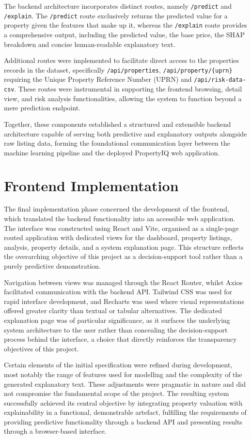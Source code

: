 The backend architecture incorporates distinct routes, namely \verb|/predict| and \verb|/explain|. The \verb|/predict| route exclusively returns the predicted value for a property given the features that make up it, whereas the \verb|/explain| route provides a comprehensive output, including the predicted value, the base price, the SHAP breakdown and concise human-readable explanatory text.

Additional routes were implemented to facilitate direct access to the properties records in the dataset, specifically \verb|/api/properties|, \verb|/api/property/{uprn}| requiring the Unique Property Reference Number (UPRN) and \verb|/api/risk-data-csv|. These routes were instrumental in supporting the frontend browsing, detail view, and risk analysis functionalities, allowing the system to function beyond a mere prediction endpoint.

Together, these components established a structured and extensible backend architecture capable of serving both predictive and explanatory outputs alongside raw listing data, forming the foundational communication layer between the machine learning pipeline and the deployed PropertyIQ web application.


\section{Frontend Implementation}

The final implementation phase concerned the development of the frontend, which translated the backend functionality into an accessible web application. The interface was constructed using React and Vite, organised as a single-page routed application with dedicated views for the dashboard, property listings, analysis, property details, and a system explanation page. This structure reflects the overarching objective of this project as a decision-support tool rather than a purely predictive demonstration.

Navigation between views was managed through the React Router, whilst Axios\parencite{Axios2025} facilitated communication with the backend API. Tailwind CSS was used for rapid interface development, and Recharts was used where visual representations offered greater clarity than textual or tabular alternatives. The dedicated explanation page was of particular significance, as it surfaces the underlying system architecture to the user rather than concealing the decision-support process behind the interface, a choice that directly reinforces the transparency objectives of this project.

Certain elements of the initial specification were refined during development, most notably the range of features used for modelling and the complexity of the generated explanatory text. These adjustments were pragmatic in nature and did not compromise the fundamental scope of the project. The resulting system successfully achieved its central objective by integrating property valuation with explainability in a functional, demonstrable artefact, fulfilling the requirements of providing predictive functionality through a backend API and presenting results through a browser-based interface.
